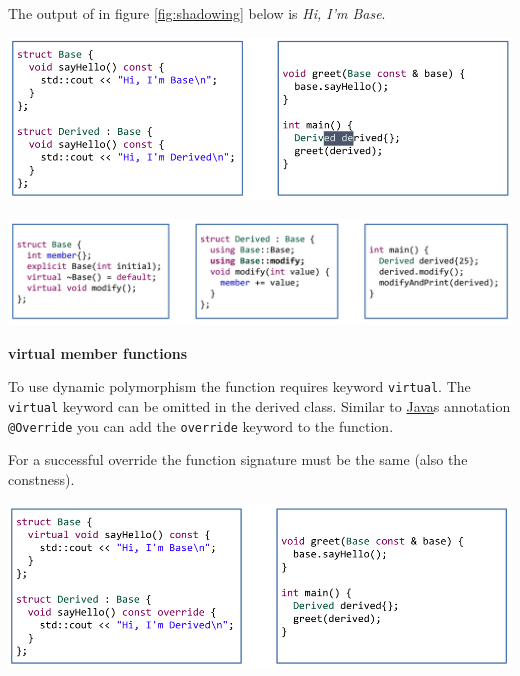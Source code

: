 \documentclass[11pt,twoside,landscape]{article}
\begin{document}
\begin{multicols}{3}
The output of in figure \ref{fig:shadowing} below is \emph{Hi, I'm Base}.


{
\begin{center}
\includegraphics[width=.9\linewidth]{img/shadowing_member_functions.png}
\end{center}
\label{fig:shadowing}
}


{
\begin{center}
\includegraphics[width=.9\linewidth]{img/shadowing_member_functions_using.png}
\end{center}
\label{fig:resolutionShadowing}
}

\textbf{virtual member functions}

To use dynamic polymorphism the function requires keyword \texttt{virtual}.
The \texttt{virtual} keyword can be omitted in the derived class.
Similar to \href{../../../roam/20201116150053-java.org}{Java}s annotation \texttt{@Override} you can add the \texttt{override} keyword to the function.

For a successful override the function signature must be the same (also the constness).

{
\begin{center}
\includegraphics[width=.9\linewidth]{img/virtual_member_function.png}
\end{center}
}


\end{multicols}
\end{document}
